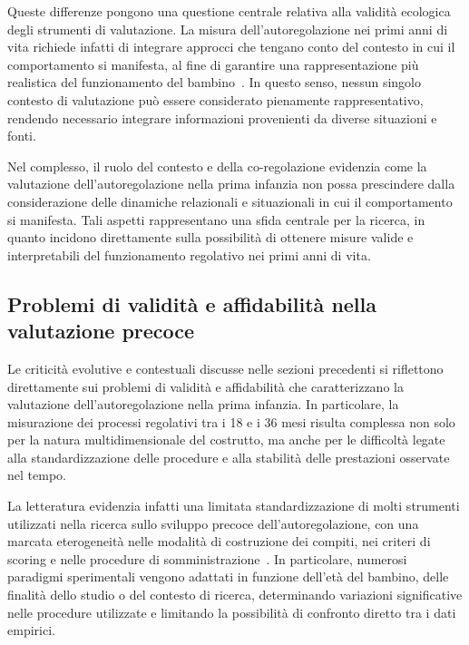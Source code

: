             Queste differenze pongono una questione centrale relativa alla validità ecologica degli strumenti di valutazione. La misura dell'autoregolazione nei primi anni di vita richiede infatti di integrare approcci che tengano conto del contesto in cui il comportamento si manifesta, al fine di garantire una rappresentazione più realistica del funzionamento del bambino~\cite{mcclelland2012}. In questo senso, nessun singolo contesto di valutazione può essere considerato pienamente rappresentativo, rendendo necessario integrare informazioni provenienti da diverse situazioni e fonti.

            Nel complesso, il ruolo del contesto e della co-regolazione evidenzia come la valutazione dell'autoregolazione nella prima infanzia non possa prescindere dalla considerazione delle dinamiche relazionali e situazionali in cui il comportamento si manifesta. Tali aspetti rappresentano una sfida centrale per la ricerca, in quanto incidono direttamente sulla possibilità di ottenere misure valide e interpretabili del funzionamento regolativo nei primi anni di vita.

        \subsection{Problemi di validità e affidabilità nella valutazione precoce}
        \label{sec:3_2_3}

            Le criticità evolutive e contestuali discusse nelle sezioni precedenti si riflettono direttamente sui problemi di validità e affidabilità che caratterizzano la valutazione dell'autoregolazione nella prima infanzia. In particolare, la misurazione dei processi regolativi tra i 18 e i 36 mesi risulta complessa non solo per la natura multidimensionale del costrutto, ma anche per le difficoltà legate alla standardizzazione delle procedure e alla stabilità delle prestazioni osservate nel tempo.

            La letteratura evidenzia infatti una limitata standardizzazione di molti strumenti utilizzati nella ricerca sullo sviluppo precoce dell'autoregolazione, con una marcata eterogeneità nelle modalità di costruzione dei compiti, nei criteri di scoring e nelle procedure di somministrazione~\cite{hughes2002,mcclelland2012}. In particolare, numerosi paradigmi sperimentali vengono adattati in funzione dell'età del bambino, delle finalità dello studio o del contesto di ricerca, determinando variazioni significative nelle procedure utilizzate e limitando la possibilità di confronto diretto tra i dati empirici.

